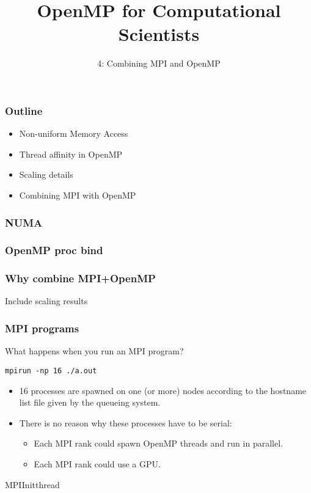 \documentclass{beamer}
\title{OpenMP for Computational Scientists}
\subtitle{4: Combining MPI and OpenMP}
\begin{document}
\frame{\titlepage}

\begin{frame}
\frametitle{Outline}
\begin{itemize}
  \item Non-uniform Memory Access
  \item Thread affinity in OpenMP
  \item Scaling details
  \item Combining MPI with OpenMP
\end{itemize}
\end{frame}

\begin{frame}
\frametitle{NUMA}
\end{frame}

\begin{frame}
\frametitle{OpenMP proc bind}
\end{frame}

\begin{frame}
\frametitle{Why combine MPI+OpenMP}
Include scaling results
\end{frame}

\begin{frame}[fragile]
\frametitle{MPI programs}
What happens when you run an MPI program?
\begin{verbatim}
mpirun -np 16 ./a.out
\end{verbatim}

\begin{itemize}
  \item 16 processes are spawned on one (or more) nodes according to the hostname list file given by the queueing system.
  \item There is no reason why these processes have to be serial:
  \begin{itemize}
    \item Each MPI rank could spawn OpenMP threads and run in parallel.
    \item Each MPI rank could use a GPU.
  \end{itemize}
\end{itemize}

  MPIInitthread

\end{frame}

\end{document}
